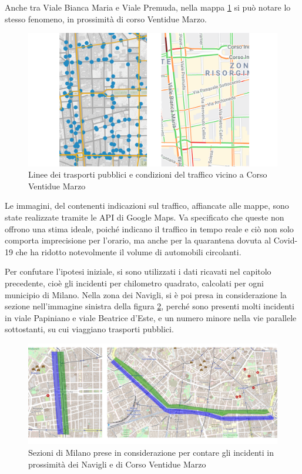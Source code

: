 \documentclass[a4paper]{report}
\begin{document}
Anche tra Viale Bianca Maria e Viale Premuda, nella mappa \ref{fig:22-marzo} si può 
notare lo stesso fenomeno, in prossimità di corso Ventidue Marzo. 

\begin{figure}
    \includegraphics[width=\linewidth]{../src/atm/22_marzo.png}
    \caption{Linee dei trasporti pubblici e condizioni del traffico vicino 
    a Corso Ventidue Marzo}
    \label{fig:22-marzo}
\end{figure}

Le immagini, 
del contenenti indicazioni sul traffico, affiancate alle mappe, 
sono state realizzate tramite le API di 
Google Maps. 
Va specificato che queste non offrono una stima ideale, poiché indicano 
il traffico in tempo reale e ciò non solo comporta imprecisione per l'orario, 
ma anche per 
la quarantena dovuta al Covid-19 che ha ridotto notevolmente il volume di automobili 
circolanti. 

Per confutare l'ipotesi iniziale, si sono utilizzati i dati ricavati 
nel capitolo precedente, 
cioè gli incidenti per chilometro quadrato, calcolati per ogni municipio di Milano. 
Nella zona dei Navigli, si è poi presa in considerazione la sezione 
nell'immagine sinistra 
della figura \ref{fig:zona-navigli-22marzo}, 
perché sono presenti molti incidenti in viale Papiniano e viale Beatrice d'Este, 
e un numero minore nella vie parallele sottostanti, su cui viaggiano 
trasporti pubblici. 

\begin{figure}
    \includegraphics[width=\linewidth]{img_unite/zona_navigli_22marzo.png}
    \caption{Sezioni di Milano prese in considerazione per contare gli incidenti in 
    prossimità dei Navigli e di Corso Ventidue Marzo}
    \label{fig:zona-navigli-22marzo}
\end{figure}
\end{document}
